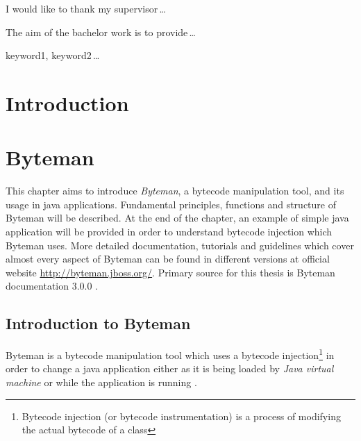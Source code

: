 \documentclass[12pt,oneside]{fithesis2}
\begin{document}
  \FrontMatter                    %
    \ThesisTitlePage                %
    \begin{ThesisDeclaration}       %
      \DeclarationText
      \AdvisorName
    \end{ThesisDeclaration}
    \begin{ThesisThanks}            %
      I would like to thank my supervisor\,\dots
    \end{ThesisThanks}
    \begin{ThesisAbstract}          %
      The aim of the bachelor work is to provide\,\dots
    \end{ThesisAbstract}
    \begin{ThesisKeyWords}          %
      keyword1, keyword2\,\dots
    \end{ThesisKeyWords}
    \tableofcontents                %
  
  \MainMatter                     %
    \chapter{Introduction}          %
    \Blindtext
\chapter{Byteman}
This chapter aims to introduce \textit{Byteman}, a bytecode manipulation tool, and its usage in java applications. Fundamental principles, functions and structure of Byteman will be described.
At the end of the chapter, an example of simple java application will be provided in order to understand bytecode injection which Byteman uses. More detailed documentation, tutorials and guidelines 
which cover almost every aspect of Byteman can be found in different versions at official website \url{http://byteman.jboss.org/}. Primary source for this thesis is Byteman documentation 3.0.0 \cite{byteman_doc}.

\section{Introduction to Byteman}
Byteman is a bytecode manipulation tool which uses a bytecode injection\footnote{Bytecode injection (or bytecode instrumentation) is a process of modifying the actual bytecode of a class} in order to change a java application either as it is being loaded by \textit{Java virtual machine} or while the application is running \cite[Introduction to Byteman]{byteman_doc}.
\end{document}
